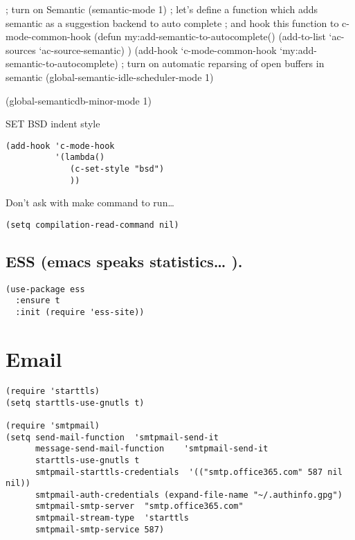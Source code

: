 \documentclass[12pt]{article}
\begin{document}
; turn on Semantic
(semantic-mode 1)
; let's define a function which adds semantic as a suggestion backend to auto complete
; and hook this function to c-mode-common-hook
(defun my:add-semantic-to-autocomplete()
(add-to-list `ac-sources `ac-source-semantic)
)
(add-hook `c-mode-common-hook `my:add-semantic-to-autocomplete)
; turn on automatic reparsing of open buffers in semantic
(global-semantic-idle-scheduler-mode 1)

(global-semanticdb-minor-mode 1)



SET BSD indent style

\lstset{language=Lisp,label= ,caption= ,numbers=none}
\begin{lstlisting}
(add-hook 'c-mode-hook
          '(lambda()
             (c-set-style "bsd")
             ))
\end{lstlisting}
Don't ask with make command to run\ldots{} 

\lstset{language=Lisp,label= ,caption= ,numbers=none}
\begin{lstlisting}
(setq compilation-read-command nil)
\end{lstlisting}

\subsection{ESS (emacs speaks statistics\ldots{} ).}
\label{sec-7-7}

\lstset{language=Lisp,label= ,caption= ,numbers=none}
\begin{lstlisting}
(use-package ess
  :ensure t
  :init (require 'ess-site))
\end{lstlisting}

\section{Email}
\label{sec-8}


\lstset{language=Lisp,label= ,caption= ,numbers=none}
\begin{lstlisting}
(require 'starttls)
(setq starttls-use-gnutls t)

(require 'smtpmail)
(setq send-mail-function  'smtpmail-send-it
      message-send-mail-function    'smtpmail-send-it
      starttls-use-gnutls t
      smtpmail-starttls-credentials  '(("smtp.office365.com" 587 nil nil))
      smtpmail-auth-credentials (expand-file-name "~/.authinfo.gpg")
      smtpmail-smtp-server  "smtp.office365.com"
      smtpmail-stream-type  'starttls
      smtpmail-smtp-service 587)
\end{lstlisting}
\end{document}

